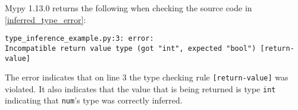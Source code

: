 Mypy 1.13.0 returns the following when checking the source code in \ref{inferred_type_error}: \begin{verbatim}
type_inference_example.py:3: error: 
Incompatible return value type (got "int", expected "bool") [return-value]
\end{verbatim}

The error indicates that on line 3 the type checking rule {\tt [return-value]} was violated. It also indicates that the value that is being returned is type {\tt int} indicating that {\tt num}'s type was correctly inferred.